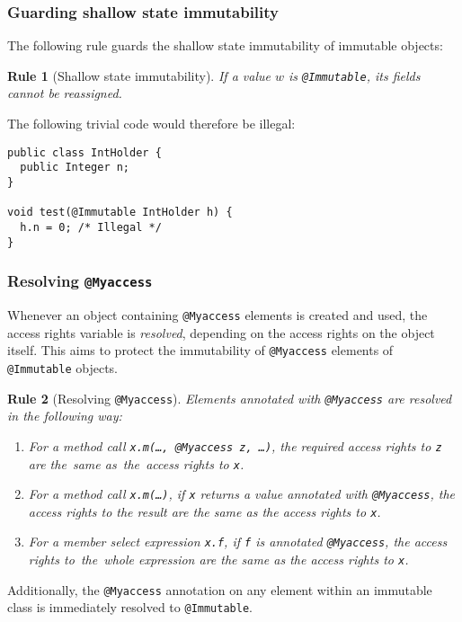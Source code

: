 \documentclass{pracamgr}
\theoremstyle{break}
\theoremstyle{break}
\theoremstyle{break}
\newtheorem{verrule}{Rule}
\begin{document}
\subsubsection{Guarding shallow state immutability} 

The following rule guards the shallow state immutability of immutable
objects:

\begin{verrule}[Shallow state immutability]
  If a value $w$ is \texttt{@Immutable}, its fields cannot be
  reassigned.
\end{verrule}
The following trivial code would therefore be illegal:
\begin{lstlisting}
public class IntHolder {
  public Integer n;
}

void test(@Immutable IntHolder h) {
  h.n = 0; /* Illegal */
}
\end{lstlisting}

\subsubsection{Resolving \texttt{@Myaccess}}  

Whenever an object containing \texttt{@Myaccess} elements is created
and used, the access rights variable is \emph{resolved}, depending on
the access rights on the object itself. This aims to protect the
immutability of \texttt{@Myaccess} elements of \texttt{@Immutable}
objects.

\begin{verrule}[Resolving \texttt{@Myaccess}]
  Elements annotated with \texttt{@Myaccess} are resolved in the
  following way:
  \begin{enumerate}[label=(\arabic*)]
  \item For a method call \texttt{x.m(\dots, @Myaccess z, \dots)}, the
    required access rights to \texttt{z} are the~same as~the~access
    rights to \texttt{x}.
  \item For a method call \texttt{x.m(\dots)}, if \texttt{x} returns a
    value annotated with \texttt{@Myaccess}, the access rights to the
    result are the same as the access rights to \texttt{x}.
  \item For a member select expression \texttt{x.f}, if \texttt{f} is
    annotated \texttt{@Myaccess}, the access rights to~the~whole
    expression are the same as the access rights to \texttt{x}.
  \end{enumerate}
\end{verrule}
Additionally, the \texttt{@Myaccess} annotation on any element within
an immutable class is immediately resolved to \texttt{@Immutable}.
\end{document}
